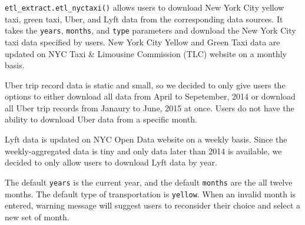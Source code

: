 \documentclass[12pt,twoside]{reedthesis}
\newenvironment{Shaded}{\begin{snugshade}}{\end{snugshade}}
\newcommand{\KeywordTok}[1]{\textcolor[rgb]{0.13,0.29,0.53}{\textbf{#1}}}
\newcommand{\DataTypeTok}[1]{\textcolor[rgb]{0.13,0.29,0.53}{#1}}
\newcommand{\DecValTok}[1]{\textcolor[rgb]{0.00,0.00,0.81}{#1}}
\newcommand{\StringTok}[1]{\textcolor[rgb]{0.31,0.60,0.02}{#1}}
\newcommand{\OperatorTok}[1]{\textcolor[rgb]{0.81,0.36,0.00}{\textbf{#1}}}
\newcommand{\NormalTok}[1]{#1}
\theoremstyle{definition}
\theoremstyle{definition}
\theoremstyle{definition}
\theoremstyle{remark}
\begin{document}
\texttt{etl\_extract.etl\_nyctaxi()} allows users to download New York
City yellow taxi, green taxi, Uber, and Lyft data from the corresponding
data sources. It takes the \texttt{years}, \texttt{months}, and
\texttt{type} parameters and download the New York City taxi data
specified by users. New York City Yellow and Green Taxi data are updated
on NYC Taxi \& Limousine Commission (TLC) website on a monthly basis.
\begin{Shaded}
\end{Shaded}
Uber trip record data is static and small, so we decided to only give
users the options to either download all data from April to Sepetember,
2014 or download all Uber trip records from Janaury to June, 2015 at
once. Users do not have the ability to download Uber data from a
specific month.
\begin{Shaded}
\end{Shaded}
Lyft data is updated on NYC Open Data website on a weekly basis. Since
the weekly-aggregated data is tiny and only data later than 2014 is
available, we decided to only allow users to download Lyft data by year.
\begin{Shaded}
\end{Shaded}
The default \texttt{years} is the current year, and the default
\texttt{months} are the all twelve months. The default type of
transportation is \texttt{yellow}. When an invalid month is entered,
warning message will suggest users to reconsider their choice and select
a new set of month.
\end{document}
